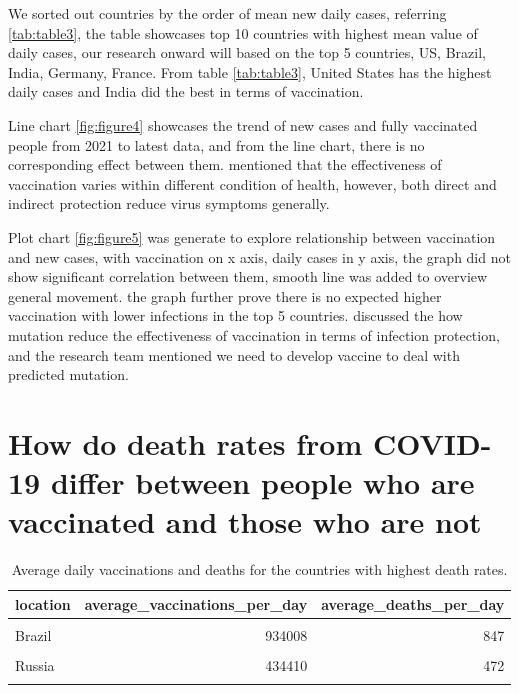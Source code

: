 \documentclass[11pt,a4paper,]{article}
\begin{document}
We sorted out countries by the order of mean new daily cases, referring \ref{tab:table3}, the table showcases top 10 countries with highest mean value of daily cases, our research onward will based on the top 5 countries, US, Brazil, India, Germany, France. From table \ref{tab:table3}, United States has the highest daily cases and India did the best in terms of vaccination.

Line chart \ref{fig:figure4} showcases the trend of new cases and fully vaccinated people from 2021 to latest data, and from the line chart, there is no corresponding effect between them. \textcite{lipsitch2020understanding} mentioned that the effectiveness of vaccination varies within different condition of health, however, both direct and indirect protection reduce virus symptoms generally.

Plot chart \ref{fig:figure5} was generate to explore relationship between vaccination and new cases, with vaccination on x axis, daily cases in y axis, the graph did not show significant correlation between them, smooth line was added to overview general movement. the graph further prove there is no expected higher vaccination with lower infections in the top 5 countries. \textcite{chen2021prediction} discussed the how mutation reduce the effectiveness of vaccination in terms of infection protection, and the research team mentioned we need to develop vaccine to deal with predicted mutation.

\clearpage

\section*{ How do death rates from COVID-19 differ between people who are vaccinated and those who are not}

\begin{table}[!h]

\caption{\label{tab:table}Average daily vaccinations and deaths for the countries with highest death rates.}
\centering
\begin{tabular}[t]{l|r|r}
\hline
location & average\_vaccinations\_per\_day & average\_deaths\_per\_day\\
\hline
\cellcolor{gray!6}{United States} & \cellcolor{gray!6}{1135290} & \cellcolor{gray!6}{1246}\\
\hline
Brazil & 934008 & 847\\
\hline
\cellcolor{gray!6}{India} & \cellcolor{gray!6}{4057187} & \cellcolor{gray!6}{657}\\
\hline
Russia & 434410 & 472\\
\hline
\cellcolor{gray!6}{Mexico} & \cellcolor{gray!6}{444551} & \cellcolor{gray!6}{407}\\
\hline
\end{tabular}
\end{table}
\end{document}
